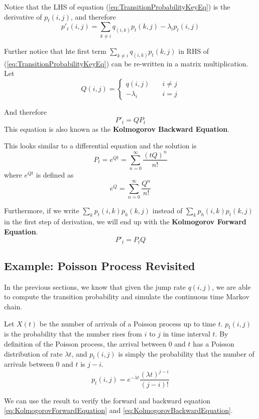     Notice that the LHS of equation (\ref{eq:TransitionProbabilityKeyEq}) is the derivative of $p_t(i,j)$, and therefore
    \[ p'_t(i,j) = \sum_{k \neq i}q_(i,k)p_t(k,j) - \lambda_i p_t(i,j) \]

    Further notice that  hte first term $\sum_{k \neq i}q_(i,k)p_t(k,j)$ in RHS of (\ref{eq:TransitionProbabilityKeyEq}) can be re-written in a matrix multiplication. Let
    \[ Q(i,j) = \begin{cases}
        q(i,j) &\quad i \neq j\\
        -\lambda_i &\quad i = j
    \end{cases} \]

    And therefore
    \begin{equation}\label{eq:KolmogorovBackwardEquation}
        P'_t = QP_t
    \end{equation}
    This equation is also known as the \textbf{Kolmogorov Backward Equation}.

    This looks similar to a differential equation and the solution is
    \[ P_t = e^{Qt} = \sum_{n=0}^{\infty}\frac{(tQ)^n}{n!} \]
    where $e^{Qt}$ is defined as
    \[ e^Q = \sum_{n=0}^{\infty} \frac{Q^n}{n!} \]

    Furthermore, if we write $\sum_{k}p_t(i,k)p_h(k,j)$ instead of $\sum_{k}p_h(i,k)p_t(k,j)$ in the first step of derivation, we will end up with the \textbf{Kolmogorov Forward Equation}.
    \begin{equation}\label{eq:KolmogorovForwardEquation}
        P'_t = P_tQ
    \end{equation}

    \subsection{Example: Poisson Process Revisited}
        In the previous sections, we know that given the jump rate $q(i,j)$, we are able to compute the transition probability and simulate the continuous time Markov chain.

        Let $X(t)$ be the number of arrivals of a Poisson process up to time $t$. $p_t(i,j)$ is the probability that the number rises from $i$ to $j$ in time interval $t$. By definition of the Poisson process, the arrival between $0$ and $t$ has a Poisson distribution of rate $\lambda t$, and $p_t(i,j)$ is simply the probability that the number of arrivals between $0$ and $t$ is $j-i$.
        \[ p_t(i,j) = e^{-\lambda t}\frac{(\lambda t)^{j-i}}{(j-i)!} \]

        We can use the result to verify the forward and backward equation \ref{eq:KolmogorovForwardEquation} and \ref{eq:KolmogorovBackwardEquation}.

